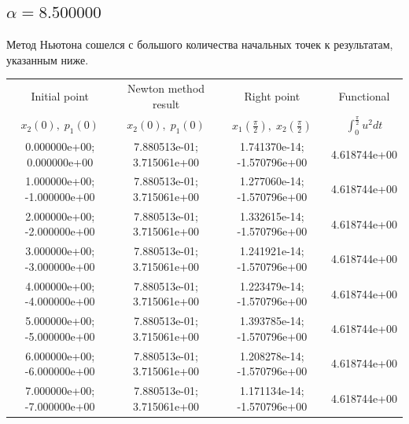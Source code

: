 \documentclass[titlepage]{article}
\def\l{\left}
\def\r{\right}
\begin{document}
\subsection{$\alpha = 8.500000$} 
Метод Ньютона сошелся с большого количества начальных точек к результатам, указанным ниже. \\ 
\begin{tabular}{ | c | c | c | c |} 
\hline 
Initial point  & Newton method result & Right point & Functional 
 \\ $x_2(0), \; p_1(0)$ & $x_2(0), \; p_1(0)$ & $x_1\l(\frac{\pi}{2}\r), \; x_2\l(\frac{\pi}{2}\r)$ & $\int_{0}^{\frac{\pi}{2}}u^2dt$  \\ \hline 
0.000000e+00; 0.000000e+00 & 7.880513e-01; 3.715061e+00 & 1.741370e-14; -1.570796e+00 & 4.618744e+00 \\ \hline 
1.000000e+00; -1.000000e+00 & 7.880513e-01; 3.715061e+00 & 1.277060e-14; -1.570796e+00 & 4.618744e+00 \\ \hline 
2.000000e+00; -2.000000e+00 & 7.880513e-01; 3.715061e+00 & 1.332615e-14; -1.570796e+00 & 4.618744e+00 \\ \hline 
3.000000e+00; -3.000000e+00 & 7.880513e-01; 3.715061e+00 & 1.241921e-14; -1.570796e+00 & 4.618744e+00 \\ \hline 
4.000000e+00; -4.000000e+00 & 7.880513e-01; 3.715061e+00 & 1.223479e-14; -1.570796e+00 & 4.618744e+00 \\ \hline 
5.000000e+00; -5.000000e+00 & 7.880513e-01; 3.715061e+00 & 1.393785e-14; -1.570796e+00 & 4.618744e+00 \\ \hline 
6.000000e+00; -6.000000e+00 & 7.880513e-01; 3.715061e+00 & 1.208278e-14; -1.570796e+00 & 4.618744e+00 \\ \hline 
7.000000e+00; -7.000000e+00 & 7.880513e-01; 3.715061e+00 & 1.171134e-14; -1.570796e+00 & 4.618744e+00 \\ \hline 
\end{tabular} 
\end{document}
